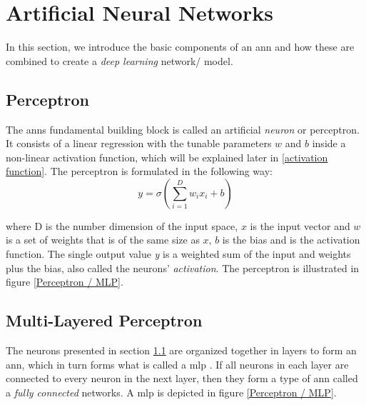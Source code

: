 \section{Artificial Neural Networks} \label{neural networks}
    In this section, we introduce the basic components of an \gls{ann} and how these are combined to create a \textit{deep learning} network/ model. 

    \subsection{Perceptron} \label{perceptron}
        The \gls{ann}s fundamental building block is called an artificial \textit{neuron} or perceptron. It consists of a linear regression with the tunable parameters $w$ and $b$ inside a non-linear activation function, which will be explained later in \ref{activation function}. The perceptron is formulated in the following way\cite{razavi2021deep_exp_per}:
            \begin{equation} \label{eq_perceptron}
                y = \sigma(\sum_{i=1}^{D}w_ix_i + b)
            \end{equation}
            
        where D is the number dimension of the input space, $x$ is the input vector and $w$ is a set of weights that is of the same size as $x$, $b$ is the bias and {\textsigma} is the activation function. The single output value \textit{y} is a weighted sum of the input and weights plus the bias, also called the neurons' \textit{activation}. The perceptron is illustrated in figure \ref{Perceptron / MLP}.
    
    \subsection{Multi-Layered Perceptron} \label{MLP}
        The neurons presented in section \ref{perceptron} are organized together in layers to form an \gls{ann}, which in turn forms what is called a \gls{mlp} \cite{razavi2021deep_exp_per}. If all neurons in each layer are connected to every neuron in the next layer, then they form a type of \gls{ann} called a \textit{fully connected} networks. A \gls{mlp} is depicted in figure \ref{Perceptron / MLP}.
        
